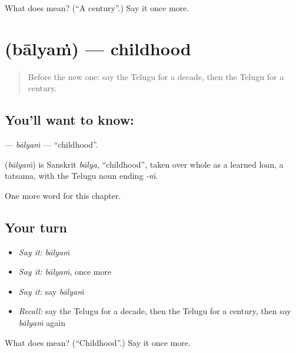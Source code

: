 \begin{tcolorbox}[breakable,colback=teal!4,colframe=teal!35!black,title={Before you move on}]
What does  mean? (\textquotedblleft{}A century\textquotedblright{}.) Say it once more.
\end{tcolorbox}
\section[\texorpdfstring{\te{బాల్యం} (bālyaṁ)}{బాల్యం (bālyaṁ)}]{ (bālyaṁ) — childhood}

\label{lesson:TE-C290-balyam}



\begin{quote}
Before the new one: say the Telugu for a decade, then the Telugu for a century.
\end{quote}

\subsection*{You'll want to know: }
\textbf{} — \emph{bālyaṁ} — \textquotedblleft{}childhood\textquotedblright{}.

\begin{cousinweb}
\textbf{} (\emph{bālyaṁ}) is Sanskrit \emph{bālya}, \textquotedblleft{}childhood\textquotedblright{}, taken over whole as a learned loan, a tatsama, with the Telugu noun ending \emph{-ṁ}.
\end{cousinweb}

\begin{grammarlens}[title={What you've built}]
One more word for this chapter.
\end{grammarlens}

\subsection*{Your turn}
\begin{itemize}
\raggedright
  \item \emph{Say it:} \emph{bālyaṁ}
  \item \emph{Say it:} \emph{bālyaṁ}, once more
  \item \emph{Say it:} say \emph{bālyaṁ}
  \item \emph{Recall:} say the Telugu for a decade, then the Telugu for a century, then say \emph{bālyaṁ} again
\end{itemize}

\begin{tcolorbox}[breakable,colback=teal!4,colframe=teal!35!black,title={Before you move on}]
What does  mean? (\textquotedblleft{}Childhood\textquotedblright{}.) Say it once more.
\end{tcolorbox}
